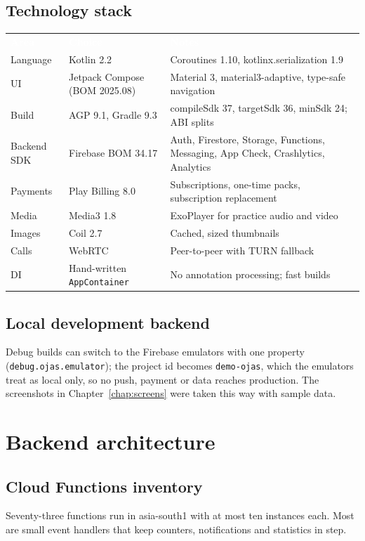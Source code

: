 \documentclass[11pt,a4paper,oneside]{report}
\newcommand{\thead}[1]{\textcolor{white}{\bfseries #1}}
\newcommand{\headrow}{\rowcolor{ojDeep}}
\begin{document}
\section{Technology stack}
\begin{tabularx}{\textwidth}{@{}p{3.6cm}p{3.2cm}L@{}}
\headrow \thead{Area} & \thead{Choice} & \thead{Notes} \\
Language & Kotlin 2.2 & Coroutines 1.10, kotlinx.serialization 1.9 \\
UI & Jetpack Compose (BOM 2025.08) & Material 3, material3-adaptive, type-safe navigation \\
Build & AGP 9.1, Gradle 9.3 & compileSdk 37, targetSdk 36, minSdk 24; ABI splits \\
Backend SDK & Firebase BOM 34.17 & Auth, Firestore, Storage, Functions, Messaging, App Check, Crashlytics, Analytics \\
Payments & Play Billing 8.0 & Subscriptions, one-time packs, subscription replacement \\
Media & Media3 1.8 & ExoPlayer for practice audio and video \\
Images & Coil 2.7 & Cached, sized thumbnails \\
Calls & WebRTC & Peer-to-peer with TURN fallback \\
DI & Hand-written \texttt{AppContainer} & No annotation processing; fast builds \\
\bottomrule
\end{tabularx}

\section{Local development backend}
Debug builds can switch to the Firebase emulators with one property (\texttt{debug.ojas.emulator}); the project id becomes \texttt{demo-ojas}, which the emulators treat as local only, so no push, payment or data reaches production. The screenshots in Chapter~\ref{chap:screens} were taken this way with sample data.

\chapter{Backend architecture}

\section{Cloud Functions inventory}
Seventy-three functions run in asia-south1 with at most ten instances each. Most are small event handlers that keep counters, notifications and statistics in step.
\end{document}

